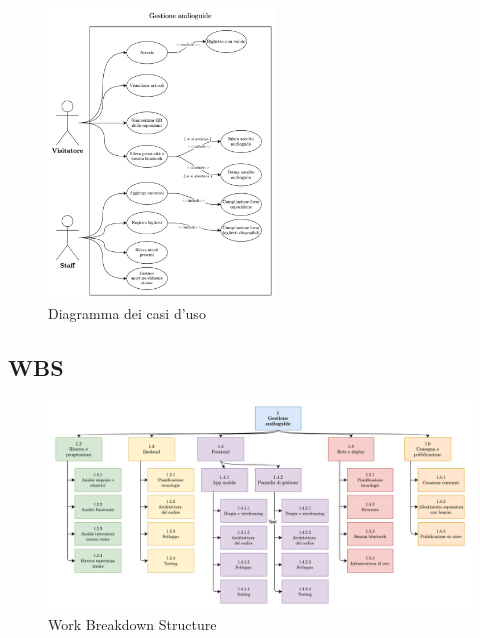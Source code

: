 \documentclass[12pt]{article}
\begin{document}
\begin{center}
    \begin{figure}[htp]
        \centering
        \includegraphics[width=6cm]{diagrams/usecase_diagrams.png}
        \caption{Diagramma dei casi d'uso}
        \label{fig:usecase}
    \end{figure}
\end{center}

\subsection{WBS}
\begin{center}
    \begin{figure}[htp]
        \centering
        \includegraphics[width=\textwidth]{diagrams/wbs.png}
        \caption{Work Breakdown Structure}
        \label{fig:wbs}
    \end{figure}
\end{center}



\clearpage
\end{document}
